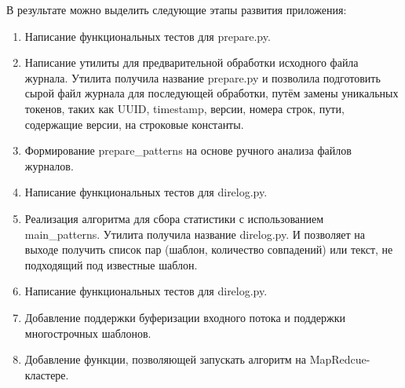 В результате можно выделить следующие этапы развития приложения:\\

\begin{enumerate}
\item Написание функциональных тестов для prepare.py.
\item Написание утилиты для предварительной обработки исходного файла журнала.
  Утилита получила название prepare.py и позволила подготовить сырой файл
  журнала для последующей обработки, путём замены уникальных токенов, таких
  как UUID, timestamp, версии, номера строк, пути, содержащие версии, на
  строковые константы.
\item Формирование prepare\_patterns на основе ручного анализа
  файлов журналов.
\item Написание функциональных тестов для direlog.py.
\item Реализация алгоритма для сбора статистики с использованием
  main\_patterns. Утилита получила название direlog.py. И позволяет на
  выходе получить список пар (шаблон, количество совпадений) или текст,
  не подходящий под известные шаблон.
\item Написание функциональных тестов для direlog.py.
\item Добавление поддержки буферизации входного потока и поддержки
  многострочных шаблонов.
\item Добавление функции, позволяющей запускать алгоритм на MapRedcue-кластере.
\end{enumerate}

